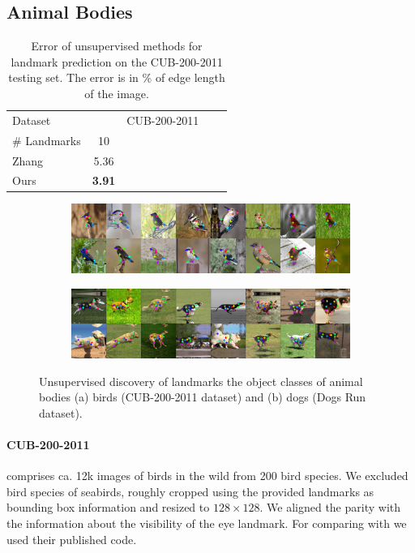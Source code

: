 	\subsection{Animal Bodies}
		\begin{table}[t]
			\caption{Error of unsupervised methods for landmark prediction on the CUB-200-2011 testing set.
			The error is in \% of edge length of the image.}
			\label{tab:static}
			\centering
			\begin{tabular}{l|cccc}
				\hline
				Dataset &  & CUB-200-2011\\
				\# Landmarks & 10  \\
				\hline
				Zhang \cite{zhang18} & 5.36 \\
				Ours  & \textbf{3.91}  \\ \hline
			\end{tabular}
		\end{table}


		\begin{figure}[htp]
			\centering
			\begin{subfigure}{1.\textwidth}
			\includegraphics[trim={0cm 0cm 0cm 0cm},clip, width=1.\linewidth]{fig/shape/0birds}\caption{}
			\end{subfigure}
			\begin{subfigure}{1.\textwidth}
			\includegraphics[trim={0cm 0cm 0cm 0cm},clip, width=1.\linewidth]{fig/shape/0dogs}\caption{}
			\end{subfigure}
			\caption{{Unsupervised discovery of landmarks the object classes of animal bodies (a) birds (CUB-200-2011 dataset) and (b) dogs (Dogs Run dataset).}}
			\label{fig:kp_animals}
		\end{figure}


		\paragraph{CUB-200-2011} \cite{wah11birds} comprises ca. 12k images of birds in the wild from 200 bird species.
		We excluded bird species of seabirds, roughly cropped using the provided landmarks as bounding box information and resized to $128\times128$.
		We aligned the parity with the information about the visibility of the eye landmark.
		For comparing with \cite{zhang18} we used their published code.


